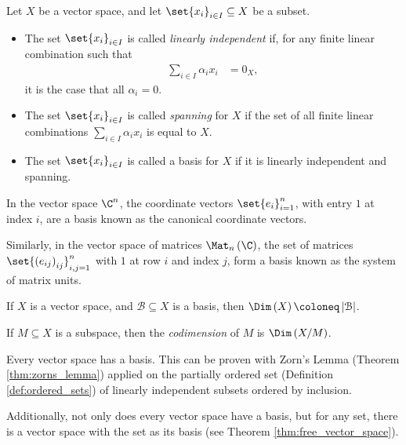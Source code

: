 \begin{definition}
  Let $X$ be a vector space, and let $\set{x_i}_{i\in I}\subseteq X$ be a subset.
  \begin{itemize}
    \item The set $\set{x_i}_{i\in I}$ is called \textit{linearly independent} if, for any finite linear combination such that
      \begin{align*}
        \sum_{i\in I}\alpha_ix_i &= 0_X,
      \end{align*}
      it is the case that all $\alpha_i = 0$.
    \item The set $\set{x_i}_{i\in I}$ is called \textit{spanning} for $X$ if the set of all finite linear combinations $\sum_{i\in I}\alpha_ix_i$ is equal to $X$.
    \item The set $\set{x_i}_{i\in I}$ is called a basis for $X$ if it is linearly independent and spanning.
  \end{itemize}
\end{definition}
\begin{example}
  In the vector space $\C^n$, the coordinate vectors $\set{e_i}_{i=1}^{n}$, with entry $1$ at index $i$, are a basis known as the canonical coordinate vectors.\newline

  Similarly, in the vector space of matrices $\Mat_n\left( \C \right)$, the set of matrices $\set{\left( e_{ij} \right)_{ij}}_{i,j=1}^{n}$ with $1$ at row $i$ and index $j$, form a basis known as the system of matrix units.
\end{example}
\begin{definition}
  If $X$ is a vector space, and $\mathcal{B}\subseteq X$ is a basis, then $\Dim\left(X\right)\coloneq \left\vert \mathcal{B} \right\vert$.\newline

  If $M\subseteq X$ is a subspace, then the \textit{codimension} of $M$ is $\Dim\left(X/M\right)$.
\end{definition}
\begin{remark}
  Every vector space has a basis. This can be proven with Zorn's Lemma (Theorem \ref{thm:zorns_lemma}) applied on the partially ordered set (Definition \ref{def:ordered_sets}) of linearly independent subsets ordered by inclusion.\newline

  Additionally, not only does every vector space have a basis, but for any set, there is a vector space with the set as its basis (see Theorem \ref{thm:free_vector_space}).
\end{remark}
